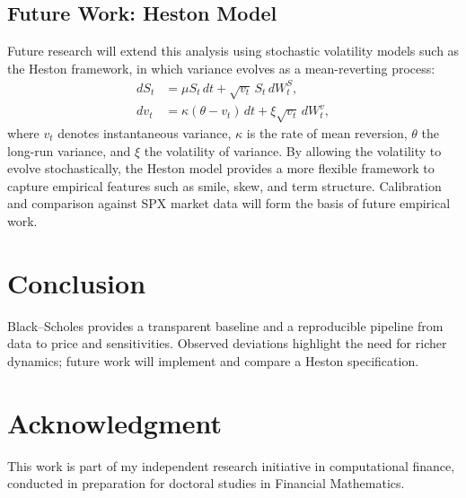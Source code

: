 \documentclass[12pt]{article}
\begin{document}
\subsection{Future Work: Heston Model}
Future research will extend this analysis using stochastic volatility models such as the Heston framework, in which variance evolves as a mean-reverting process:
\begin{equation}
\begin{aligned}
dS_t &= \mu S_t\,dt + \sqrt{v_t}\, S_t\, dW_t^S, \\
dv_t &= \kappa(\theta - v_t)\,dt + \xi \sqrt{v_t}\, dW_t^v,
\end{aligned}
\end{equation}
where $v_t$ denotes instantaneous variance, $\kappa$ is the rate of mean reversion, $\theta$ the long-run variance, and $\xi$ the volatility of variance. By allowing the volatility to evolve stochastically, the Heston model provides a more flexible framework to capture empirical features such as smile, skew, and term structure. Calibration and comparison against SPX market data will form the basis of future empirical work.


\section{Conclusion}
Black--Scholes provides a transparent baseline and a reproducible pipeline from data to price and sensitivities.
Observed deviations highlight the need for richer dynamics; future work will implement and compare a Heston specification.

\section*{Acknowledgment}
This work is part of my independent research initiative in computational finance, conducted in preparation for doctoral studies in Financial Mathematics.




\end{document}
